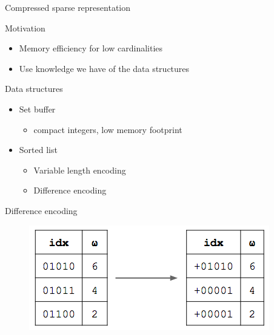 \documentclass{beamer}
\begin{document}


\begin{frame}{Compressed sparse representation}


\begin{block}{Motivation}
\begin{itemize}
\item Memory efficiency for low cardinalities
\item Use knowledge we have of the data structures
\end{itemize}
\end{block}


\begin{block}{Data structures}
\begin{itemize}
\item Set buffer
  \begin{itemize}
  \item compact integers, low memory footprint
  \end{itemize}
\item Sorted list
  \begin{itemize}
  \item Variable length encoding
  \item Difference encoding
  \end{itemize}
\end{itemize}
\end{block}


\end{frame}



\begin{frame}{Difference encoding}

\begin{figure}[c]
\includegraphics [scale=0.7]  {hyperloglog_difference.png}
\end{figure}


\end{frame}
\end{document}
